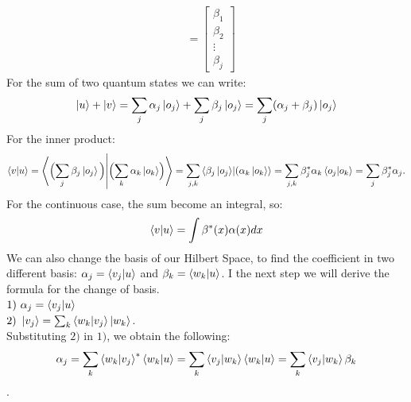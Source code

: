 \documentclass{article}
\begin{document}
  \begin{align*}
    [\mathrm{B_j}] &= \begin{bmatrix}
           \beta_1 \\
           \beta_2  \\
           \vdots \\
           \beta_j
         \end{bmatrix}
  \end{align*} 
For the sum of two quantum states we can write:
$$\ket{u} + \ket{v} = \sum_{j} \alpha_j \ket{o_j} + \sum_{j} \beta_j \ket{o_j} = \sum_{j}(\alpha_j + \beta_j) \ket{o_j}  $$
For the inner product:
  $$\bra{v}\ket{u} = \bra{ \Bigl( \sum_j \beta_j \ket{o_j} \Bigl) }\ket{ \Bigl( \sum_k{\alpha_k \ket{o_k}} \Bigl) } = \sum_{j,k} \bra{\beta_j \ket{o_j}} \ket{(\alpha_k \ket{o_k}} = \sum_{j,k} \beta^*_j \alpha_k \bra{o_j} \ket{o_k} = \sum_j \beta_j^* \alpha_j.$$
  For the continuous case, the sum become an integral, so:
  $$ \bra{v}\ket{u} = \int \beta^*(x) \alpha(x) dx$$
We can also change the basis of our Hilbert Space, to find the coefficient in two different basis:
$ \alpha_j = \bra{v_j} \ket{u}$ and $\beta_k = \bra{w_k}\ket{u}$.
I the next step we will derive the formula for the change of basis. \\ 
$1) \ \alpha_j = \bra{v_j}\ket{u}$ \\
$2)\  \ket{v_j} = \sum_k \bra{w_k} \ket{v_j} \ket{w_k}$. \\
Substituting $2)$ in $ 1)$, we obtain the following: $$\alpha_j = \sum_k \bra{w_k} \ket{v_j}^* \bra{w_k} \ket{u} = \sum_k \bra{v_j} \ket{w_k} \bra{w_k} \ket{u} = \sum_k \bra{v_j} \ket{w_k} \beta_k$$.
\end{document}
